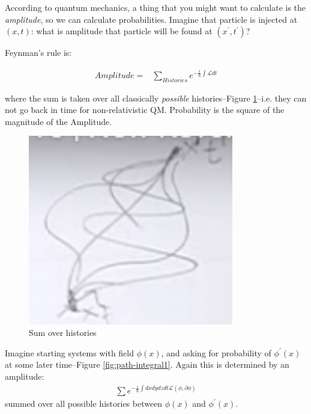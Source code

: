 \documentclass[]{article}
\begin{document}
According to quantum mechanics, a thing that you might want to calculate is the \emph{amplitude}, so we can calculate probabilities. Imagine that particle is injected at $(x,t)$: what is amplitude that particle will be found at $(x^\prime,t^\prime)$?

Feynman's rule is:

\begin{align*}
	Amplitude =& \sum_{Histories} e^{-\frac{i}{\hslash} \int \mathcal{L} dt}
\end{align*}

where the sum is taken over all classically \emph{possible} histories--Figure \ref{fig:sum:histories}--i.e. they can not go back in time for non-relativistic QM. Probability is the square of the magnitude of the Amplitude.

\begin{figure}[H]
	\caption{Sum over histories}\label{fig:sum:histories}
	\includegraphics[width=0.8\textwidth]{sum-histories}
\end{figure}



Imagine starting systems with field $\phi(x)$, and asking for probability of $\phi^\prime(x)$ at some later time--Figure \ref{fig:path-integral1}. Again this is determined by an amplitude:
\begin{align*}
	\sum e^{-\frac{i}{\hslash} \int dx dy dz dt\mathcal{L}(\phi,\partial \phi) }
\end{align*}
summed over all possible histories between $\phi(x)$ and $\phi^\prime(x)$.
\end{document}
